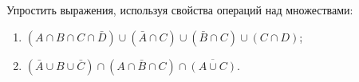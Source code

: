 \question
Упростить выражения, используя свойства операций над множествами:

\begin{enumerate}
	\renewcommand{\labelenumi}{\alph{enumi})}
	\item $(A \cap B \cap C \cap \bar{D}) \cup(\bar{A} \cap C) \cup(\bar{B} \cap C) \cup(C \cap D)$;
	\item $(\bar{A} \cup B \cup \bar{C}) \cap(A \cap \bar{B} \cap C) \cap \overline{(A \cup C)}$.
\end{enumerate}
